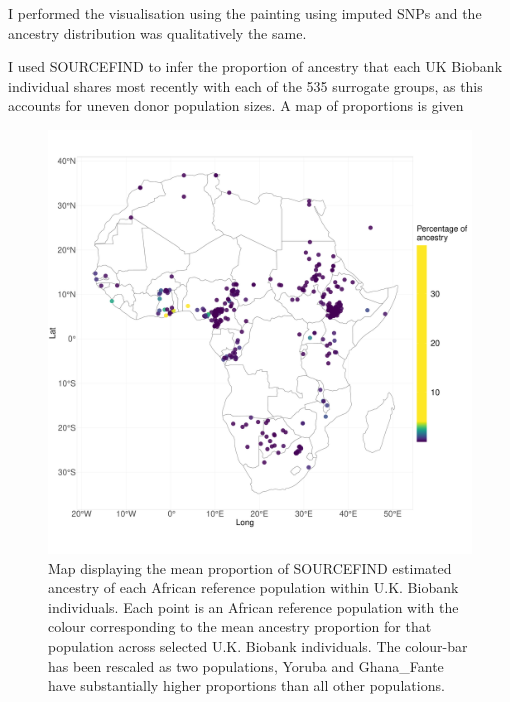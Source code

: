 I performed the visualisation using the painting using imputed SNPs and the ancestry distribution was qualitatively the same. 

I used SOURCEFIND to infer the proportion of ancestry that each UK Biobank individual shares most recently with each of the 535 surrogate groups, as this accounts for uneven donor population sizes. A map of proportions is given 

\begin{figure}[htp]
    \centering
    \includegraphics[width=1.0\textwidth]{../images/chapter3/SF_props_map.pdf}
    \caption{Map displaying the mean proportion of SOURCEFIND estimated ancestry of each African reference population within U.K. Biobank individuals. Each point is an African reference population with the colour corresponding to the mean ancestry proportion for that population across selected U.K. Biobank individuals. The colour-bar has been rescaled as two populations, Yoruba and Ghana\_Fante have substantially higher proportions than all other populations.} 
    \label{fig:SF_props_map}
\end{figure}


